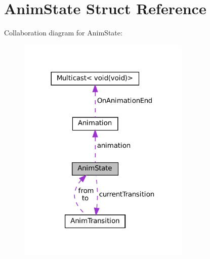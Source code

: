 \hypertarget{structAnimState}{}\section{Anim\+State Struct Reference}
\label{structAnimState}


Collaboration diagram for Anim\+State\+:\nopagebreak
\begin{figure}[H]
\begin{center}
\leavevmode
\includegraphics[width=233pt]{structAnimState__coll__graph}
\end{center}
\end{figure}
